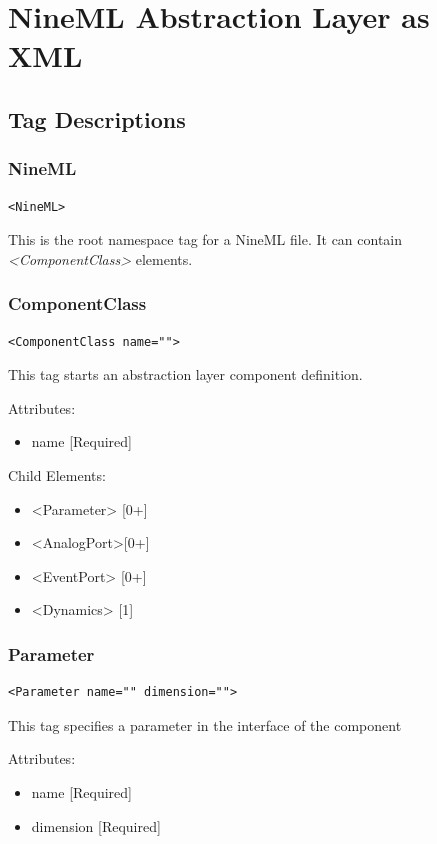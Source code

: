\documentclass{article}
\begin{document}
\section{NineML Abstraction Layer as XML}

\subsection{Tag Descriptions}

\subsubsection{NineML}
%
\begin{lstlisting}
<NineML>
\end{lstlisting}

This is the root namespace tag for a NineML file. It can contain
\textsl{<ComponentClass>} elements.

\subsubsection{ComponentClass}
%
\begin{lstlisting}
<ComponentClass name="">
\end{lstlisting}

This tag starts an abstraction layer component definition.

Attributes:
%
\begin{itemize}
\item name {[}Required{]}
\end{itemize}

Child Elements:
%
\begin{itemize}
\item <Parameter> {[}0+{]}
\item <AnalogPort>{[}0+{]}
\item <EventPort> {[}0+{]}
\item <Dynamics>  {[}1{]}
\end{itemize}

\subsubsection{Parameter}
%
\begin{lstlisting}
<Parameter name="" dimension="">
\end{lstlisting}

This tag specifies a parameter in the interface of the component

Attributes:
%
\begin{itemize}
\item name {[}Required{]}
\item dimension {[}Required{]}
\end{itemize}
\end{document}
